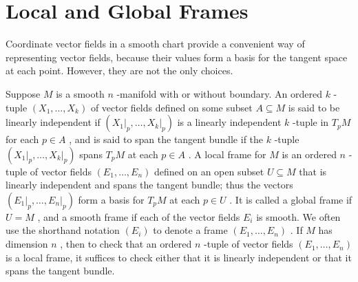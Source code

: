 \section{Local and Global Frames}

\begin{definition}
\label{def:8-55-extra-1}
\leanok
Coordinate vector fields in a smooth chart provide a convenient way of representing vector fields, because their values form a basis for the tangent space at each point. However, they are not the only choices.

Suppose $M$ is a smooth $n$ -manifold with or without boundary. An ordered $k$ - tuple $\left( {{X}_{1},\ldots ,{X}_{k}}\right)$ of vector fields defined on some subset $A \subseteq  M$ is said to be linearly independent if $\left( {{\left. {X}_{1}\right| }_{p},\ldots ,{\left. {X}_{k}\right| }_{p}}\right)$ is a linearly independent $k$ -tuple in ${T}_{p}M$ for each $p \in  A$ , and is said to span the tangent bundle if the $k$ -tuple $\left( {{\left. {X}_{1}\right| }_{p},\ldots ,{\left. {X}_{k}\right| }_{p}}\right)$ spans ${T}_{p}M$ at each $p \in  A$ . A local frame for $M$ is an ordered $n$ -tuple of vector fields $\left( {{E}_{1},\ldots ,{E}_{n}}\right)$ defined on an open subset $U \subseteq  M$ that is linearly independent and spans the tangent bundle; thus the vectors $\left( {{\left. {E}_{1}\right| }_{p},\ldots ,{\left. {E}_{n}\right| }_{p}}\right)$ form a basis for ${T}_{p}M$ at each $p \in  U$ . It is called a global frame if $U = M$ , and a smooth frame if each of the vector fields ${E}_{i}$ is smooth. We often use the shorthand notation $\left( {E}_{i}\right)$ to denote a frame $\left( {{E}_{1},\ldots ,{E}_{n}}\right)$ . If $M$ has dimension $n$ , then to check that an ordered $n$ -tuple of vector fields $\left( {{E}_{1},\ldots ,{E}_{n}}\right)$ is a local frame, it suffices to check either that it is linearly independent or that it spans the tangent bundle.
\end{definition}

